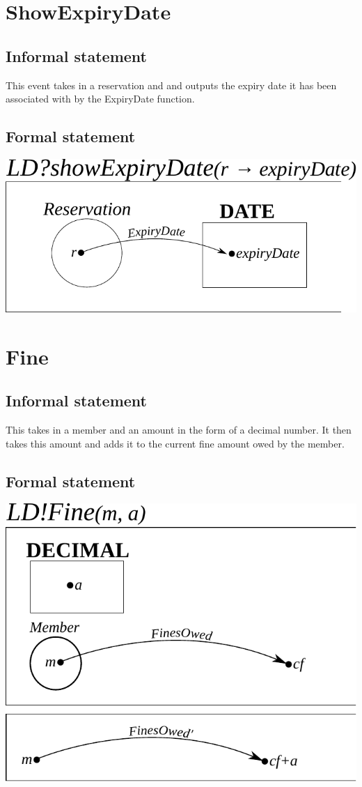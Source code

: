 \documentclass[]{report}
\begin{document}
\section{ShowExpiryDate}
\subsection{Informal statement}
This event takes in a reservation and and outputs the expiry date it has been associated with by the ExpiryDate function.
\subsection{Formal statement}
\begin{center}
	\includegraphics{show_expiry_date.pdf}
\end{center}
\newpage
\section{Fine}
\subsection{Informal statement}
This takes in a member and an amount in the form of a decimal number. It then takes this amount and adds it to the current fine amount owed by the member.
\subsection{Formal statement}
\begin{center}
	\includegraphics{add_fine.pdf}
\end{center}
\newpage
\end{document}
